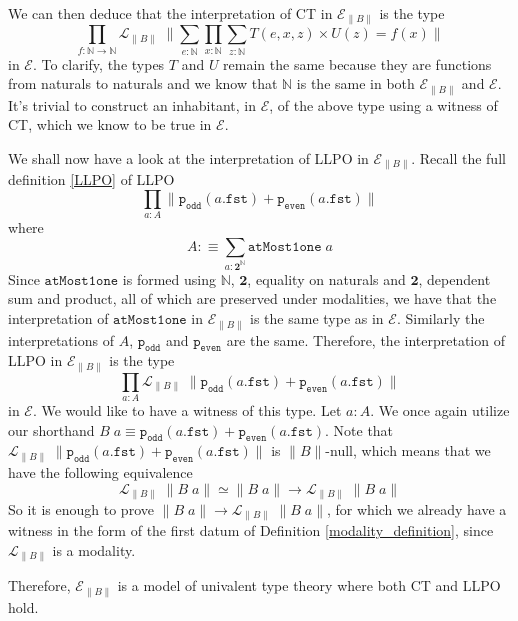 \documentclass[12pt]{report}
\begin{document}
We can then deduce that the interpretation of CT in $\mathcal{E}_{\lVert B \rVert}$ is the type 
$$\prod_{f : \mathbb{N}\rightarrow \mathbb{N}} \mathcal{L}_{\lVert B \rVert}\;\Big\lVert \sum_{e : \mathbb{N}} \prod_{x : \mathbb{N}} \sum_{z : \mathbb{N}} T(e,x,z) \times U(z) = f(x) \Big\rVert$$
in $\mathcal{E}$. To clarify, the types $T$ and $U$ remain the same because they are functions from naturals to naturals and we know that $\mathbb{N}$ is the same in both $\mathcal{E}_{\lVert B \rVert}$ and $\mathcal{E}$. 
It's trivial to construct an inhabitant, in $\mathcal{E}$, of the above type using a witness of CT, which we know to be true in $\mathcal{E}$. 

We shall now have a look at the interpretation of LLPO in $\mathcal{E}_{\lVert B \rVert}$. 
Recall the full definition \ref{LLPO} of LLPO
$$\prod_{a : A}\lVert \mathtt{p_{odd}}(a.\mathtt{fst}) + \mathtt{p_{even}}(a.\mathtt{fst}) \rVert$$
where $$A :\equiv \sum_{a: \mathbf{2}^\mathbb{N}}\mathtt{atMost1one}\;a$$
Since $\mathtt{atMost1one}$ is formed using $\mathbb{N}$, $\mathbf{2}$, equality on naturals and $\mathbf{2}$, dependent sum and product, all of which are preserved under modalities, we have that the interpretation of $\mathtt{atMost1one}$ in $\mathcal{E}_{\lVert B \rVert}$ is the same type as in $\mathcal{E}$. 
Similarly the interpretations of $A$, $\mathtt{p_{odd}}$ and $\mathtt{p_{even}}$ are the same. 
Therefore, the interpretation of LLPO in $\mathcal{E}_{\lVert B \rVert}$ is the type 
$$\prod_{a : A}\mathcal{L}_{\lVert B \rVert}\;\lVert \mathtt{p_{odd}}(a.\mathtt{fst}) + \mathtt{p_{even}}(a.\mathtt{fst}) \rVert$$
in $\mathcal{E}$. 
We would like to have a witness of this type. 
Let $a : A$. 
We once again utilize our shorthand $B\; a \equiv \mathtt{p_{odd}}(a.\mathtt{fst}) + \mathtt{p_{even}}(a.\mathtt{fst})$. 
Note that $\mathcal{L}_{\lVert B \rVert}\;\lVert \mathtt{p_{odd}}(a.\mathtt{fst}) + \mathtt{p_{even}}(a.\mathtt{fst}) \rVert$ is $\lVert B \rVert$-null, which means that we have the following equivalence
$$\mathcal{L}_{\lVert B \rVert}\; \lVert B\;a\rVert \simeq \lVert B\; a \rVert \rightarrow \mathcal{L}_{\lVert B \rVert}\;\lVert B\; a \rVert$$
So it is enough to prove $\lVert B\; a \rVert \rightarrow \mathcal{L}_{\lVert B \rVert}\;\lVert B\; a \rVert$, for which we already have a witness in the form of the first datum of Definition \ref{modality_definition}, since $\mathcal{L}_{\lVert B \rVert}$ is a modality. 

Therefore, $\mathcal{E}_{\lVert B \rVert}$ is a model of univalent type theory where both CT and LLPO hold.

\printbibliography
\end{document}
